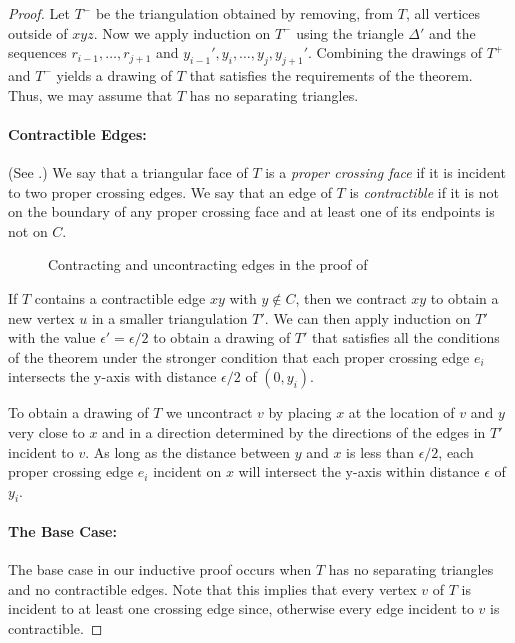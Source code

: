 \documentclass{patmorin}
\begin{document}
\begin{proof}
   Let $T^-$ be the triangulation obtained by removing, from $T$, all
   vertices outside of $xyz$.  Now we apply induction on $T^-$ using
   the triangle $\Delta'$ and the sequences $r_{i-1},\ldots,r_{j+1}$ and
   $y_{i-1}',y_i,\ldots,y_{j},y_{j+1}'$.  Combining the drawings of $T^+$
   and $T^-$ yields a drawing of $T$ that satisfies the requirements of
   the theorem.  Thus, we may assume that $T$ has no separating triangles.

   \paragraph{Contractible Edges:}
   (See .)
   We say that a triangular face of $T$ is a \emph{proper crossing face}
   if it is incident to two proper crossing edges.  We say that an edge
   of $T$ is \emph{contractible} if it is not on the boundary of any
   proper crossing face and at least one of its endpoints is not on $C$.

   \begin{figure}
      \caption{Contracting and uncontracting edges in the proof of
      }
   \end{figure}

   If $T$ contains a contractible edge $xy$ with $y\not\in C$,
   then we contract $xy$ to obtain a new vertex $u$ in a smaller
   triangulation $T'$.   We can then apply induction on $T'$ with the
   value $\epsilon'=\epsilon/2$ to obtain a drawing of $T'$ that satisfies
   all the conditions of the theorem under the stronger condition that
   each proper crossing edge $e_i$ intersects the y-axis with distance
   $\epsilon/2$ of $(0,y_i)$.

   To obtain a drawing of $T$ we uncontract $v$ by placing $x$ at
   the location of $v$ and $y$ very close to $x$ and in a direction
   determined by the directions of the edges in $T'$ incident to $v$.
   As long as the distance between $y$ and $x$ is less than $\epsilon/2$,
   each proper crossing edge $e_i$ incident on $x$ will intersect the
   y-axis within distance $\epsilon$ of $y_i$.

   \paragraph{The Base Case:}
   The base case in our inductive proof occurs when $T$ has no separating
   triangles and no contractible edges.  Note that this implies that
   every vertex $v$ of $T$ is incident to at least one crossing edge
   since, otherwise every edge incident to $v$ is contractible.
  

\end{proof}
\end{document}

